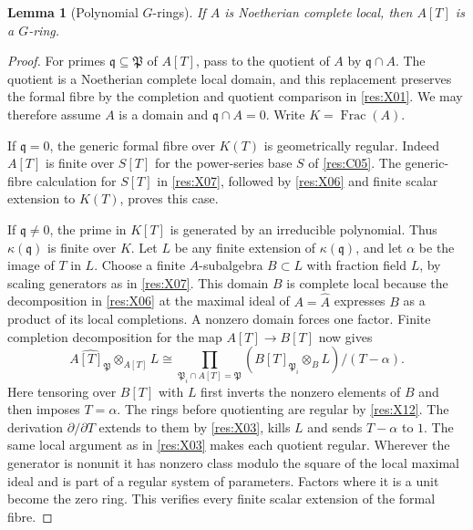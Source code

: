 \documentclass[11pt,oneside,openany]{book}
\newtheorem{lemma}[theorem]{Lemma}
\theoremstyle{definition}
\theoremstyle{remark}
\begin{document}
\begin{lemma}[Polynomial \(G\)-rings]\label{res:X13}
If \(A\) is Noetherian complete local, then \(A[T]\) is a \(G\)-ring.
\end{lemma}
\begin{proof}
For primes \(\mathfrak q\subseteq\mathfrak P\) of \(A[T]\), pass to the quotient of \(A\) by \(\mathfrak q\cap A\). The quotient is a Noetherian complete local domain, and this replacement preserves the formal fibre by the completion and quotient comparison in \ref{res:X01}. We may therefore assume \(A\) is a domain and \(\mathfrak q\cap A=0\). Write \(K=\operatorname{Frac}(A)\).

If \(\mathfrak q=0\), the generic formal fibre over \(K(T)\) is geometrically regular. Indeed \(A[T]\) is finite over \(S[T]\) for the power-series base \(S\) of \ref{res:C05}. The generic-fibre calculation for \(S[T]\) in \ref{res:X07}, followed by \ref{res:X06} and finite scalar extension to \(K(T)\), proves this case.

If \(\mathfrak q\ne0\), the prime in \(K[T]\) is generated by an irreducible polynomial. Thus \(\kappa(\mathfrak q)\) is finite over \(K\). Let \(L\) be any finite extension of \(\kappa(\mathfrak q)\), and let \(\alpha\) be the image of \(T\) in \(L\). Choose a finite \(A\)-subalgebra \(B\subset L\) with fraction field \(L\), by scaling generators as in \ref{res:X07}. This domain \(B\) is complete local because the decomposition in \ref{res:X06} at the maximal ideal of \(A=\widehat A\) expresses \(B\) as a product of its local completions. A nonzero domain forces one factor. Finite completion decomposition for the map \(A[T]\to B[T]\) now gives
\[
 \widehat{A[T]_{\mathfrak P}}\otimes_{A[T]}L
  \cong
  \prod_{\mathfrak P_i\cap A[T]=\mathfrak P}
       \left(\widehat{B[T]_{\mathfrak P_i}}\otimes_B L\right)/(T-\alpha).
\]
Here tensoring over \(B[T]\) with \(L\) first inverts the nonzero elements of \(B\) and then imposes \(T=\alpha\). The rings before quotienting are regular by \ref{res:X12}. The derivation \(\partial/\partial T\) extends to them by \ref{res:X03}, kills \(L\) and sends \(T-\alpha\) to \(1\). The same local argument as in \ref{res:X03} makes each quotient regular. Wherever the generator is nonunit it has nonzero class modulo the square of the local maximal ideal and is part of a regular system of parameters. Factors where it is a unit become the zero ring. This verifies every finite scalar extension of the formal fibre.
\end{proof}
\end{document}
